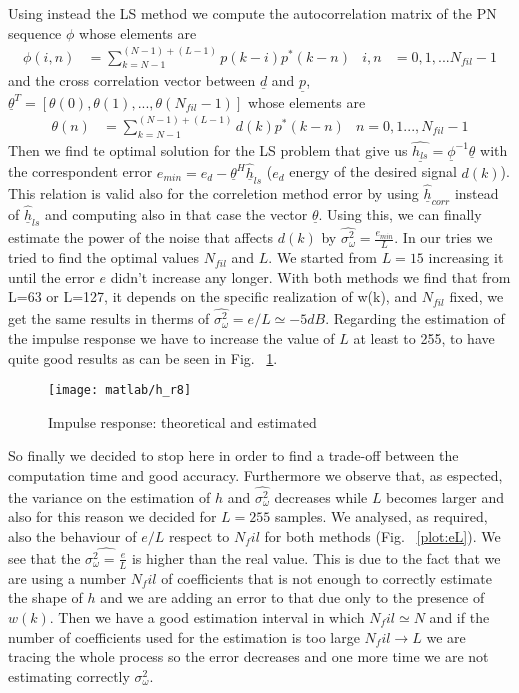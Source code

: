 \documentclass{article}
\renewcommand{\vec}[1]{\underline{#1}}
\begin{document}
Using instead the LS method we compute the autocorrelation matrix of the PN sequence $\phi$ whose elements are 
\begin{align*}
\phi(i,n) &= \sum_{k=N-1}^{(N-1) + (L-1)}{p(k-i)p^*(k-n)}&
i,n&=0,1,...N_{fil} -1
\end{align*}
and the cross correlation vector between $\vec{d}$ and $\vec{p}$, $\vec{\theta}^T = [\theta(0), \theta(1),..., \theta(N_{fil}-1)]$ whose elements are
\begin{align*}
\theta(n)& = \sum_{k=N-1}^{(N-1) + (L-1)}{d(k)p^*(k-n)}& n=0,1...,N_{fil}-1
\end{align*}
Then we find te optimal solution for the LS problem that give us  $\vec{\hat{h_{ls}}} = \vec{\phi}^{-1} \vec{\theta}$ with the correspondent error 
$ e_{min} = e_d - \vec{\theta}^H \vec{\hat{h}}_{ls}$ ($e_d$ energy of the desired signal $d(k)$). This relation is valid also for the correletion method error by using $\vec{\hat{h}}_{corr}$ instead of $\vec{\hat{h}}_{ls}$ and computing also in that case the vector $\vec{\theta}$.  Using this, we can finally estimate the power of the noise that affects $d(k)$ by $\hat{\sigma_\omega^2} = \frac{e_{min}}{L}$.
\newline In our tries we tried to find the optimal values $N_{fil}$ and $L$. We started from $L = 15$ increasing it until the error $e$ didn't increase any longer. With both methods we find that from L=63 or L=127, it depends on the specific realization of w(k), and $N_{fil}$ fixed, we get the same results in therms of $\hat{\sigma_\omega^2} = e/L\simeq -5 dB$. Regarding the estimation of the impulse response we have to increase the value of $L$ at least to 255, to have quite good results as can be seen in Fig. ~\ref{plot:h}.
\begin{figure}[htbp]
  \centering
  \texttt{[image: matlab/h\_r8]}
  \caption{Impulse response: theoretical and estimated}
    \label{plot:h}
\end{figure}
So finally we decided to stop here in order to find a trade-off between the computation time and good accuracy. Furthermore we observe that, as espected, the variance on the estimation of $h$ and $\hat{\sigma_\omega^2}$ decreases while $L$ becomes larger and also for this reason we decided for $L=255$ samples.
We analysed, as required, also the behaviour of $e/L$ respect to $N_fil$ for both methods (Fig. ~\ref{plot:eL}). We see that the $\hat{\sigma_\omega^2 = \frac{e}{L}}$ is higher than the real value. This is due to the fact that we are using a number $N_fil$ of coefficients that is not enough to correctly estimate the shape of $h$ and we are adding an error to that due only to the presence of $w(k)$. Then we have a good estimation interval in which $N_fil \simeq N$ and if the number of coefficients used for the estimation is too large $N_fil \longrightarrow L$ we are tracing the whole process so the error decreases and one more time we are not estimating correctly $\sigma_\omega^2$.
\end{document}
